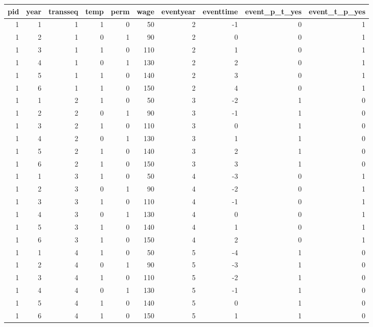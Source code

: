 \begin{tabular}{rrrrrrrrrr}
  \hline
pid & year & transseq & temp & perm & wage & eventyear & eventtime & event\_p\_t\_yes & event\_t\_p\_yes \\ 
  \hline
1 & 1 & 1 & 1 & 0 & 50 & 2 & -1 & 0 & 1 \\ 
  1 & 2 & 1 & 0 & 1 & 90 & 2 & 0 & 0 & 1 \\ 
  1 & 3 & 1 & 1 & 0 & 110 & 2 & 1 & 0 & 1 \\ 
  1 & 4 & 1 & 0 & 1 & 130 & 2 & 2 & 0 & 1 \\ 
  1 & 5 & 1 & 1 & 0 & 140 & 2 & 3 & 0 & 1 \\ 
  1 & 6 & 1 & 1 & 0 & 150 & 2 & 4 & 0 & 1 \\ 
  1 & 1 & 2 & 1 & 0 & 50 & 3 & -2 & 1 & 0 \\ 
  1 & 2 & 2 & 0 & 1 & 90 & 3 & -1 & 1 & 0 \\ 
  1 & 3 & 2 & 1 & 0 & 110 & 3 & 0 & 1 & 0 \\ 
  1 & 4 & 2 & 0 & 1 & 130 & 3 & 1 & 1 & 0 \\ 
  1 & 5 & 2 & 1 & 0 & 140 & 3 & 2 & 1 & 0 \\ 
  1 & 6 & 2 & 1 & 0 & 150 & 3 & 3 & 1 & 0 \\ 
  1 & 1 & 3 & 1 & 0 & 50 & 4 & -3 & 0 & 1 \\ 
  1 & 2 & 3 & 0 & 1 & 90 & 4 & -2 & 0 & 1 \\ 
  1 & 3 & 3 & 1 & 0 & 110 & 4 & -1 & 0 & 1 \\ 
  1 & 4 & 3 & 0 & 1 & 130 & 4 & 0 & 0 & 1 \\ 
  1 & 5 & 3 & 1 & 0 & 140 & 4 & 1 & 0 & 1 \\ 
  1 & 6 & 3 & 1 & 0 & 150 & 4 & 2 & 0 & 1 \\ 
  1 & 1 & 4 & 1 & 0 & 50 & 5 & -4 & 1 & 0 \\ 
  1 & 2 & 4 & 0 & 1 & 90 & 5 & -3 & 1 & 0 \\ 
  1 & 3 & 4 & 1 & 0 & 110 & 5 & -2 & 1 & 0 \\ 
  1 & 4 & 4 & 0 & 1 & 130 & 5 & -1 & 1 & 0 \\ 
  1 & 5 & 4 & 1 & 0 & 140 & 5 & 0 & 1 & 0 \\ 
  1 & 6 & 4 & 1 & 0 & 150 & 5 & 1 & 1 & 0 \\ 
   \hline
\end{tabular}
